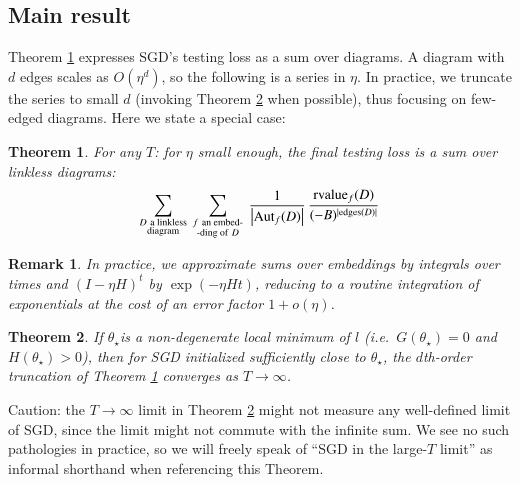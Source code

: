 \documentclass[anon,12pt]{colt2021} %
\newtheorem{thm}{Theorem}
\newtheorem{rmk}{Remark}
\newcommand{\wabs}[1]{\left|#1\right|}
\newcommand{\Aut}{\text{\textnormal{Aut}}}
\newcommand{\rvalue}{\text{\textnormal{rvalue}}}
\newcommand{\edges}{\text{\textnormal{edges}}}
\begin{document}
        \subsection{Main result}
    

            Theorem \ref{thm:resum} expresses SGD's testing loss as a sum over
            diagrams.  A diagram with $d$ edges scales as $O(\eta^d)$, so the
            following is a series in $\eta$.  In practice, we truncate the
            series to small $d$ (invoking Theorem \ref{thm:converge} when
            possible), thus focusing on few-edged diagrams.  Here we state a special case:
            \begin{thm} \label{thm:resum}
                For any $T$: for $\eta$ small enough, the final testing loss is
                a sum over \emph{linkless} diagrams: 
                \begin{equation*} \label{eq:resum}
                    \sum_{\substack{D~\text{a linkless} \\ \text{diagram}}}
                    ~
                    \sum_{\substack{f~\text{an embed-} \\ \text{-ding of}~D}}
                    ~
                    \frac{1}{\wabs{\Aut_f(D)}}
                    \,
                    \frac{{\rvalue_f}(D)}{(-B)^{|\edges(D)|}}
                \end{equation*}
            \end{thm}
    
     
            \begin{rmk} \label{rmk:integrate}
                In practice, we approximate sums over embeddings by integrals
                over times and $(I-\eta H)^t$ by $\exp(- \eta H t)$, reducing
                to a routine integration of exponentials at the cost of an
                error factor $1 + o(\eta)$.
            \end{rmk}
    
     
            \begin{thm} \label{thm:converge}
                If $\theta_\star$is a non-degenerate local minimum of $l$
                (i.e.\ $G(\theta_\star)=0$ and $H(\theta_\star) > 0$), then for
                SGD initialized sufficiently close to $\theta_\star$, the
                $d$th-order truncation of Theorem \ref{thm:resum} converges as
                $T\to \infty$.
            \end{thm}
            \par\noindent
            Caution: the $T\to \infty$ limit in Theorem \ref{thm:converge}
            might not measure any well-defined limit of SGD, since the limit
            might not commute with the infinite sum.  We see no such
            pathologies in practice, so we will freely speak of ``SGD in the
            large-$T$ limit'' as informal shorthand when referencing this
            Theorem.
\end{document}
